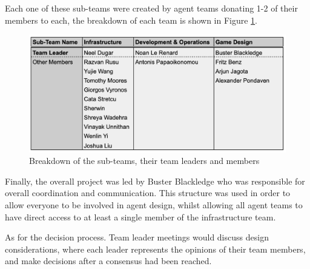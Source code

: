 Each one of these sub-teams were created by agent teams donating 1-2 of their members to each, the breakdown of each team is shown in Figure \ref{fig:subteams}.

\begin{figure}[htb]
    \centering
    \includegraphics[scale=0.6]{000_introduction/images/agentteams.png}
    \caption{Breakdown of the sub-teams, their team leaders and members}
    \label{fig:subteams}
\end{figure}


Finally, the overall project was led by Buster Blackledge who was responsible for overall coordination and communication. This structure was used in order to allow everyone to be involved in agent design, whilst allowing all agent teams to have direct access to at least a single member of the infrastructure team. 

As for the decision process. Team leader meetings would discuss design considerations, where each leader represents the opinions of their team members, and make decisions after a consensus had been reached. 